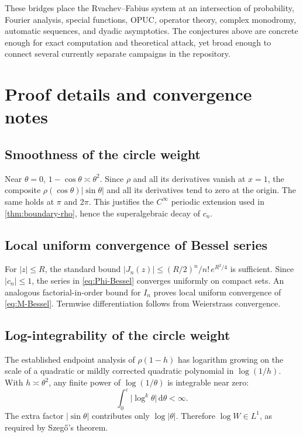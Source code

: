 \documentclass[11pt,oneside]{article}
\theoremstyle{definition}
\newcommand{\dd}{\,\mathrm d}
\begin{document}
These bridges place the Rvachev--Fabius system at an intersection of probability,
Fourier analysis, special functions, OPUC, operator theory, complex monodromy, automatic
sequences, and dyadic asymptotics. The conjectures above are concrete enough for exact
computation and theoretical attack, yet broad enough to connect several currently separate
campaigns in the repository.

\appendix

\section{Proof details and convergence notes}
\label{app:proofs}

\subsection{Smoothness of the circle weight}

Near \(\theta=0\), \(1-\cos\theta\asymp\theta^2\). Since \(\rho\) and all its derivatives
vanish at \(x=1\), the composite \(\rho(\cos\theta)|\sin\theta|\) and all its derivatives tend
to zero at the origin. The same holds at \(\pi\) and \(2\pi\). This justifies the
\(C^\infty\) periodic extension used in \cref{thm:boundary-rho}, hence the superalgebraic
decay of \(c_n\).

\subsection{Local uniform convergence of Bessel series}

For \(|z|\le R\), the standard bound \(|J_n(z)|\le (R/2)^n/n!\,e^{R^2/4}\) is sufficient.
Since \(|c_n|\le1\), the series in \eqref{eq:Phi-Bessel} converges uniformly on compact sets.
An analogous factorial-in-order bound for \(I_n\) proves local uniform convergence of
\eqref{eq:M-Bessel}. Termwise differentiation follows from Weierstrass convergence.

\subsection{Log-integrability of the circle weight}

The established endpoint analysis of \(\rho(1-h)\) has logarithm growing on the scale of a
quadratic or mildly corrected quadratic polynomial in \(\log(1/h)\). With
\(h\asymp\theta^2\), any finite power of \(\log(1/\theta)\) is integrable near zero:
\[
 \int_0^\varepsilon \bigl|\log^k\theta\bigr|\dd\theta<\infty.
\]
The extra factor \(|\sin\theta|\) contributes only \(\log|\theta|\). Therefore
\(\log W\in L^1\), as required by Szeg\H{o}'s theorem.
\end{document}
